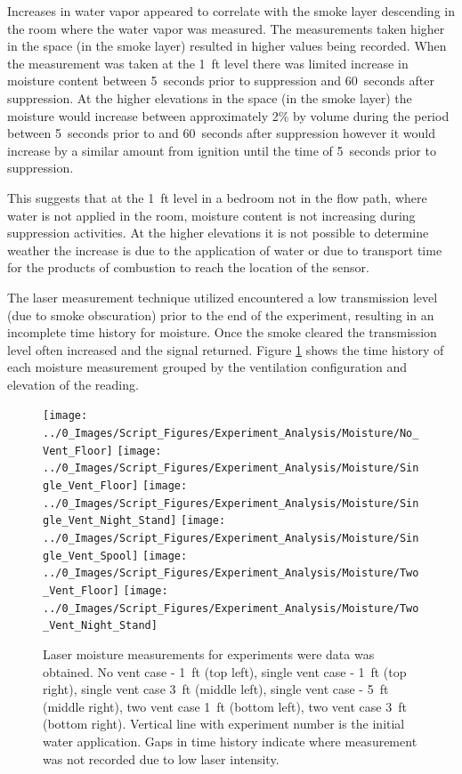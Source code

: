 \documentclass[12pt,oneside]{book}
\begin{document}
Increases in water vapor appeared to correlate with the smoke layer descending in the room where the water vapor was measured. The measurements taken higher in the space (in the smoke layer) resulted in higher values being recorded. When the measurement was taken at the 1~ft level there was limited increase in moisture content between 5~seconds prior to suppression and 60~seconds after suppression. At the higher elevations in the space (in the smoke layer) the moisture would increase between approximately 2\% by volume during the period between 5~seconds prior to and 60~seconds after suppression however it would increase by a similar amount from ignition until the time of 5~seconds prior to suppression. 

This suggests that at the 1~ft level in a bedroom not in the flow path, where water is not applied in the room, moisture content is not increasing during suppression activities. At the higher elevations it is not possible to determine weather the increase is due to the application of water or due to transport time for the products of combustion to reach the location of the sensor. 

The laser measurement technique utilized encountered a low transmission level (due to smoke obscuration) prior to the end of the experiment, resulting in an incomplete time history for moisture. Once the smoke cleared the transmission level often increased and the signal returned.  Figure \ref{fig:moisture_plots} shows the time history of each moisture measurement grouped by the ventilation configuration and elevation of the reading.

\begin{figure}[H]
\centering
\texttt{[image: ../0\_Images/Script\_Figures/Experiment\_Analysis/Moisture/No\_Vent\_Floor]} 
\texttt{[image: ../0\_Images/Script\_Figures/Experiment\_Analysis/Moisture/Single\_Vent\_Floor]}
\texttt{[image: ../0\_Images/Script\_Figures/Experiment\_Analysis/Moisture/Single\_Vent\_Night\_Stand]}
\texttt{[image: ../0\_Images/Script\_Figures/Experiment\_Analysis/Moisture/Single\_Vent\_Spool]}
\texttt{[image: ../0\_Images/Script\_Figures/Experiment\_Analysis/Moisture/Two\_Vent\_Floor]}
\texttt{[image: ../0\_Images/Script\_Figures/Experiment\_Analysis/Moisture/Two\_Vent\_Night\_Stand]}
\caption[Laser Moisture Measurements]{Laser moisture measurements for experiments were data was obtained. No vent case - 1~ft (top left), single vent case - 1~ft (top right), single vent case 3~ft (middle left), single vent case - 5~ft (middle right), two vent case 1~ft (bottom left), two vent case 3~ft (bottom right). Vertical line with experiment number is the initial water application. Gaps in time history indicate where measurement was not recorded due to low laser intensity.}
\label{fig:moisture_plots}
\end{figure}
\end{document}

